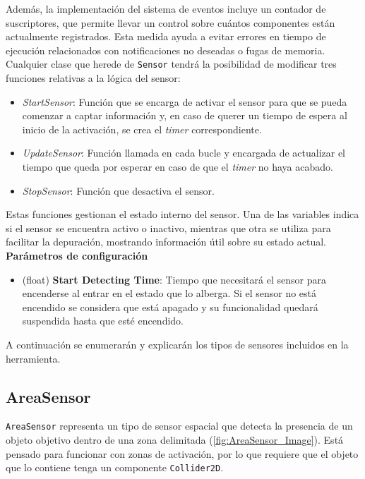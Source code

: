 Además, la implementación del sistema de eventos incluye un contador de suscriptores, que permite llevar un control sobre cuántos componentes están actualmente registrados. Esta medida ayuda a evitar errores en tiempo de ejecución relacionados con notificaciones no deseadas o fugas de memoria.\\

Cualquier clase que herede de \texttt{Sensor} tendrá la posibilidad de modificar tres funciones relativas a la lógica del sensor:

\begin{itemize}
	\item \textit{StartSensor}: Función que se encarga de activar el sensor para que se pueda comenzar a captar información y, en caso de querer un tiempo de espera al inicio de la activación, se crea el \textit{timer} correspondiente.
	\item \textit{UpdateSensor}: Función llamada en cada bucle y encargada de actualizar el tiempo que queda por esperar en caso de que el \textit{timer} no haya acabado.
	\item \textit{StopSensor}: Función que desactiva el sensor.
\end{itemize}
Estas funciones gestionan el estado interno del sensor. Una de las variables indica si el sensor se encuentra activo o inactivo, mientras que otra se utiliza para facilitar la depuración, mostrando información útil sobre su estado actual.\\

\textbf{Parámetros de configuración}
\begin{itemize}
	\item (float) \textbf{Start Detecting Time}: Tiempo que necesitará el sensor para encenderse al entrar en el estado que lo alberga. Si el sensor no está encendido se considera que está apagado y su funcionalidad quedará suspendida hasta que esté encendido.
\end{itemize}

A continuación se enumerarán y explicarán los tipos de sensores incluidos en la herramienta.\\

\subsection{AreaSensor}

\texttt{AreaSensor} representa un tipo de sensor espacial que detecta la presencia de un objeto objetivo dentro de una zona delimitada (\autoref{fig:AreaSensor_Image}). Está pensado para funcionar con zonas de activación, por lo que requiere que el objeto que lo contiene tenga un componente \texttt{Collider2D}.\\

